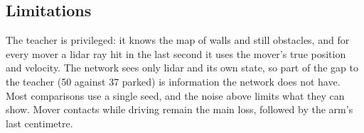 \subsection{Limitations}
The teacher is privileged: it knows the map of walls and still obstacles, and for every mover a lidar ray hit in the
last second it uses the mover's true position and velocity. The network sees only lidar and its own state, so part of
the gap to the teacher (50 against 37 parked) is information the network does not have. Most comparisons use
a single seed, and the noise above limits what they can show. Mover contacts while driving remain the main loss,
followed by the arm's last centimetre.
